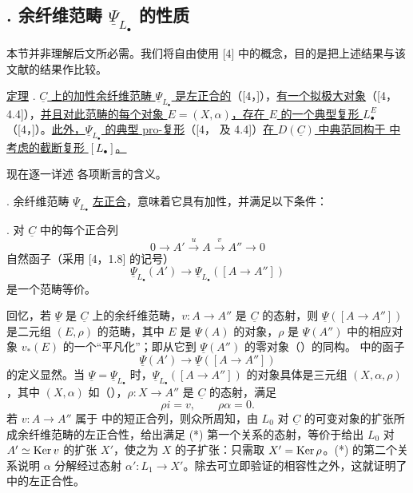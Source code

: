 \subsection*{. 余纤维范畴 $\underline\Psi_{L_\bullet}$ 的性质}

本节并非理解后文所必需。我们将自由使用 [4] 中的概念，目的是把上述结果与该文献的结果作比较。

\underline{定理} . \underline{$\underline C$ 上的加性余纤维范畴 $\underline\Psi_{L_\bullet}$ 是左正合的}（[4，]），\underline{有一个拟极大对象}（[4，4.4]），\underline{并且对此范畴的每个对象 $E=(X,\alpha)$，存在 $E$ 的一个典型复形 $L^E_\bullet$}（[4，]）。\underline{此外，$\underline\Psi_{L_\bullet}$ 的典型 pro-复形}（[4， 及 4.4]）\underline{在 $D(\underline C)$ 中典范同构于  中考虑的截断复形 $[L_\bullet]$。}

现在逐一详述  各项断言的含义。

. 余纤维范畴 $\underline\Psi_{L_\bullet}$ \underline{左正合}，意味着它具有加性，并满足以下条件：

. 对 $\underline C$ 中的每个正合列
\[
 0\longrightarrow A'\xrightarrow{u}A\xrightarrow{v}A''
 \longrightarrow0
\]
自然函子（采用 [4，1.8] 的记号）
\[
 \underline\Psi_{L_\bullet}(A')
 \longrightarrow
 \underline\Psi_{L_\bullet}([A\longrightarrow A''])
\]
是一个范畴等价。

回忆，若 $\underline\Psi$ 是 $\underline C$ 上的余纤维范畴，$v:A\longrightarrow A''$ 是 $\underline C$ 的态射，则 $\underline\Psi([A\longrightarrow A''])$ 是二元组 $(E,\rho)$ 的范畴，其中 $E$ 是 $\underline\Psi(A)$ 的对象，$\rho$ 是 $\underline\Psi(A'')$ 中的相应对象 $v_*(E)$ 的一个“平凡化”；即从它到 $\underline\Psi(A'')$ 的零对象（）的同构。 中的函子
\[
 \underline\Psi(A')\longrightarrow
 \underline\Psi([A\longrightarrow A''])
\]
的定义显然。当 $\underline\Psi=\underline\Psi_{L_\bullet}$ 时，$\underline\Psi_{L_\bullet}([A\longrightarrow A''])$ 的对象具体是三元组 $(X,\alpha,\rho)$，其中 $(X,\alpha)$ 如（），$\rho:X\longrightarrow A''$ 是 $\underline C$ 的态射，满足
\begin{equation}\tag{*}
 \rho i=v,\qquad \rho\alpha=0.
\end{equation}
若 $v:A\longrightarrow A''$ 属于  中的短正合列，则众所周知，由 $L_0$ 对 $\underline C$ 的可变对象的扩张所成余纤维范畴的左正合性，给出满足 (*) 第一个关系的态射，等价于给出 $L_0$ 对 $A'\simeq\operatorname{Ker} v$ 的扩张 $X'$，使之为 $X$ 的子扩张：只需取 $X'=\operatorname{Ker}\rho$。(*) 的第二个关系说明 $\alpha$ 分解经过态射 $\alpha':L_1\longrightarrow X'$。除去可立即验证的相容性之外，这就证明了  中的左正合性。

